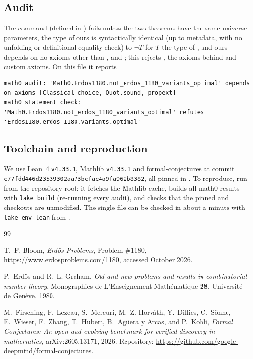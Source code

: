 \documentclass[11pt]{amsart}
\theoremstyle{plain}
\theoremstyle{definition}
\begin{document}
{\subsection*{Audit}
The command  (defined in ) fails unless the two theorems have the same universe parameters, the type of ours is syntactically identical (up to metadata, with no unfolding or definitional-equality check) to $\neg T$ for $T$ the type of , and ours depends on no axioms other than ,  and ; this rejects , the axioms behind  and custom axioms. On this file it reports
\begin{lstlisting}[basicstyle=\ttfamily\scriptsize, upquote=true]
math0 audit: 'Math0.Erdos1180.not_erdos_1180_variants_optimal' depends on axioms [Classical.choice, Quot.sound, propext]
math0 statement check: 'Math0.Erdos1180.not_erdos_1180_variants_optimal' refutes 'Erdos1180.erdos_1180.variants.optimal'
\end{lstlisting}

\subsection*{Toolchain and reproduction}
We use Lean~4 \cite{Lean4} \texttt{v4.33.1}, Mathlib \cite{Mathlib} \texttt{v4.33.1} and formal-conjectures \cite{FC} at commit \texttt{c77fdd446d23539302aa73bcfae4a9fa962b8382}, all pinned in . To reproduce, run  from the repository root: it fetches the Mathlib cache, builds all math0 results with \texttt{lake build} (re-running every audit), and checks that the pinned  and  checkouts are unmodified. The single file can be checked in about a minute with \texttt{lake env lean} from .

\begin{thebibliography}{99}
\small\raggedright

T.~F. Bloom, \emph{Erd\H{o}s Problems}, Problem \#1180, \url{https://www.erdosproblems.com/1180}, accessed October 2026.

P.~Erd\H{o}s and R.~L. Graham, \emph{Old and new problems and results in combinatorial number theory}, Monographies de L'Enseignement Math\'ematique \textbf{28}, Universit\'e de Gen\`eve, 1980.

M.~Firsching, P.~Lezeau, S.~Mercuri, M.~Z. Horv\'ath, Y.~Dillies, C.~S\"onne, E.~Wieser, F.~Zhang, T.~Hubert, B.~Ag\"uera y Arcas, and P.~Kohli, \emph{Formal Conjectures: An open and evolving benchmark for verified discovery in mathematics}, arXiv:2605.13171, 2026. Repository: \url{https://github.com/google-deepmind/formal-conjectures}.


\end{thebibliography}}
\end{document}
